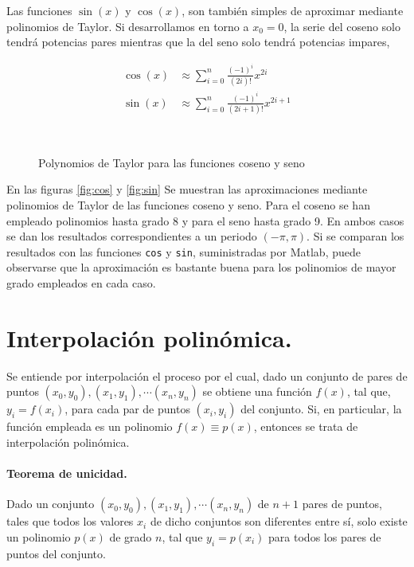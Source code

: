 Las funciones $\sin(x)$ y $\cos(x)$, son también simples de aproximar mediante polinomios de Taylor. Si desarrollamos en torno a $x_0=0$, la serie del coseno solo tendrá potencias pares mientras que la del seno solo tendrá potencias impares,

\begin{align*}
\cos(x)&\approx \sum_{i=0}^n \frac{(-1)^i}{(2i)!}x^{2i}\\
\sin(x)&\approx \sum_{i=0}^n \frac{(-1)^i}{(2i+1)!}x^{2i+1}
\end{align*}

\begin{figure}[h]
\centering
{} \qquad 
{}\\
\caption{Polynomios de Taylor para las funciones coseno y seno  }
\end{figure}

En las figuras \ref{fig:cos} y \ref{fig:sin} Se muestran las aproximaciones mediante polinomios de Taylor de las funciones coseno y seno. Para el coseno se han empleado polinomios hasta grado 8 y para el seno hasta grado 9. En ambos casos se dan los resultados correspondientes a un periodo $(-\pi, \pi)$. Si se comparan los resultados con las funciones \texttt{cos} y \texttt{sin}, suministradas por Matlab, puede observarse que la aproximación es bastante buena para los polinomios de mayor grado empleados en cada caso.

\section{Interpolación polinómica.}

Se entiende por interpolación el proceso por el cual, dado un conjunto de pares de puntos $(x_0,y_0),(x_1,y_1),\cdots (x_n,y_n)$ se obtiene una función $f(x)$, tal que, $y_i=f(x_i)$, para cada par de puntos $(x_i,y_i)$ del conjunto. Si, en particular, la función empleada es un polinomio $f(x)\equiv p(x)$, entonces se trata de interpolación polinómica. 

\paragraph{Teorema de unicidad.} Dado un conjunto   $(x_0,y_0),(x_1,y_1),\cdots (x_n,y_n)$ de $n+1$ pares de puntos, tales que todos los valores $x_i$ de dicho conjuntos son diferentes entre sí, solo existe un polinomio $p(x)$ de grado $n$, tal que $y_i=p(x_i)$ para todos los pares de puntos del conjunto.

